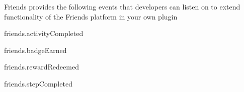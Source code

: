 Friends provides the following events that developers can listen on to extend functionality of the Friends platform in your own plugin


\begin{DoxyItemize}
\item friends.\+activity\+Completed
\item friends.\+badge\+Earned
\item friends.\+reward\+Redeemed
\item friends.\+step\+Completed 
\end{DoxyItemize}